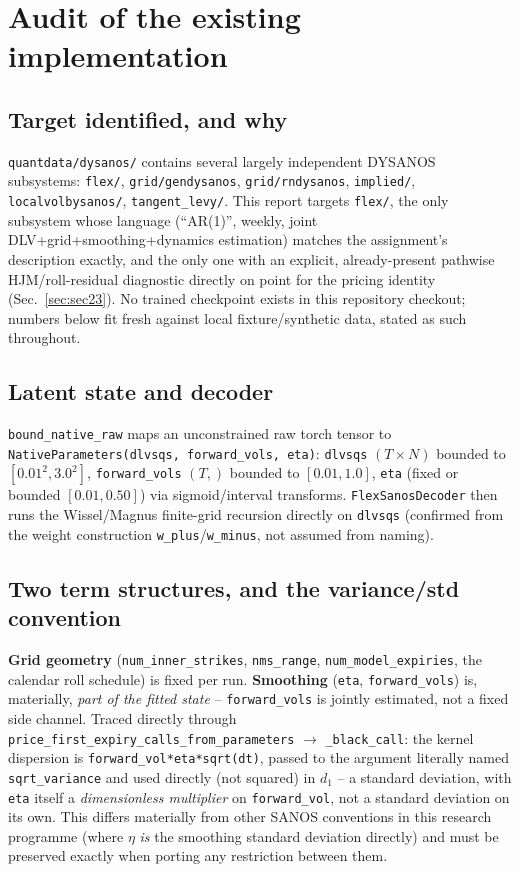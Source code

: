 \section{Audit of the existing implementation}
\label{sec:audit}

\subsection{Target identified, and why}

\texttt{quantdata/dysanos/} contains several largely independent DYSANOS
subsystems: \texttt{flex/}, \texttt{grid/gendysanos}, \texttt{grid/rndysanos},
\texttt{implied/}, \texttt{localvolbysanos/}, \texttt{tangent\_levy/}. This
report targets \texttt{flex/}, the only subsystem whose language (``AR(1)'',
weekly, joint DLV+grid+smoothing+dynamics estimation) matches the assignment's
description exactly, and the only one with an explicit, already-present
pathwise HJM/roll-residual diagnostic directly on point for the pricing
identity (Sec.~\ref{sec:sec23}). No trained checkpoint exists in this
repository checkout; numbers below fit fresh against local fixture/synthetic
data, stated as such throughout.

\subsection{Latent state and decoder}

\texttt{bound\_native\_raw} maps an unconstrained raw torch tensor to
\texttt{NativeParameters(dlvsqs, forward\_vols, eta)}: \texttt{dlvsqs}
$(T{\times}N)$ bounded to $[0.01^2,3.0^2]$, \texttt{forward\_vols} $(T,)$
bounded to $[0.01,1.0]$, \texttt{eta} (fixed or bounded $[0.01,0.50]$) via
sigmoid/interval transforms. \texttt{FlexSanosDecoder} then runs the
Wissel/Magnus finite-grid recursion directly on \texttt{dlvsqs} (confirmed
from the weight construction \texttt{w\_plus}/\texttt{w\_minus}, not assumed
from naming).

\subsection{Two term structures, and the variance/std convention}

\textbf{Grid geometry} (\texttt{num\_inner\_strikes}, \texttt{nms\_range},
\texttt{num\_model\_expiries}, the calendar roll schedule) is fixed per run.
\textbf{Smoothing} (\texttt{eta}, \texttt{forward\_vols}) is, materially,
\emph{part of the fitted state} -- \texttt{forward\_vols} is jointly
estimated, not a fixed side channel. Traced directly through
\texttt{price\_first\_expiry\_calls\_from\_parameters} $\to$
\texttt{\_black\_call}: the kernel dispersion is
\texttt{forward\_vol*eta*sqrt(dt)}, passed to the argument literally named
\texttt{sqrt\_variance} and used directly (not squared) in $d_1$ -- a standard
deviation, with \texttt{eta} itself a \emph{dimensionless multiplier} on
\texttt{forward\_vol}, not a standard deviation on its own. This differs
materially from other SANOS conventions in this research programme (where
$\eta$ \emph{is} the smoothing standard deviation directly) and must be
preserved exactly when porting any restriction between them.

